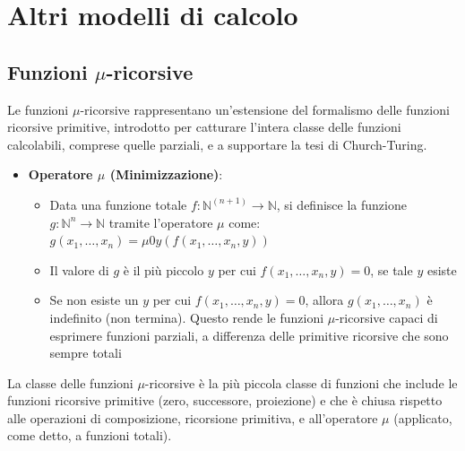 \documentclass[12pt, a4paper]{report}
\begin{document}
            \section{Altri modelli di calcolo}
                \subsection{Funzioni $\mu$-ricorsive}
                    Le funzioni $\mu$-ricorsive rappresentano un'estensione del formalismo delle funzioni ricorsive primitive, introdotto per catturare l'intera classe delle funzioni calcolabili, comprese quelle parziali, e a supportare la tesi di Church-Turing.
                    \begin{itemize}
                        \item \textbf{Operatore $\mu$ (Minimizzazione)}: \begin{itemize}
                            \item Data una funzione totale $f: \mathbb{N}^{(n+1)} \to \mathbb{N}$, si definisce la funzione $g: \mathbb{N}^n \to \mathbb{N}$ tramite l'operatore $\mu$ come: $g(x_1, \ldots, x_n) = \mu0 y(f(x_1, \ldots, x_n, y))$
                            \item Il valore di $g$ è il più piccolo $y$ per cui $f(x_1, \ldots, x_n, y) = 0$, se tale $y$ esiste
                            \item Se non esiste un $y$ per cui $f(x_1, \ldots, x_n, y) = 0$, allora $g(x_1, \ldots, x_n)$ è indefinito (non termina). Questo rende le funzioni $\mu$-ricorsive capaci di esprimere funzioni parziali, a differenza delle primitive ricorsive che sono sempre totali
                        \end{itemize}
                    \end{itemize}
                    \begin{definitionbox}{}{}
                        La classe delle funzioni $\mu$-ricorsive è la più piccola classe di funzioni che include le funzioni ricorsive primitive (zero, successore, proiezione) e che è chiusa rispetto alle operazioni di composizione, ricorsione primitiva, e all'operatore $\mu$ (applicato, come detto, a funzioni totali).
                    \end{definitionbox}
\end{document}
